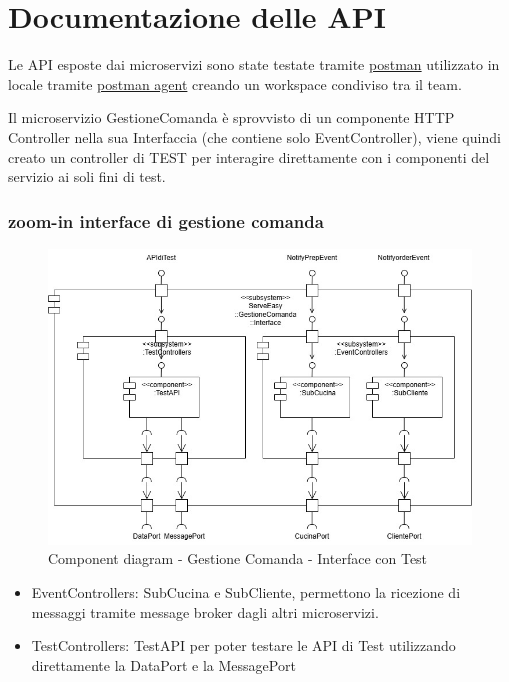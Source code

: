 \section{Documentazione delle API}

Le API esposte dai microservizi sono state testate tramite \href{https://www.postman.com/}{postman} utilizzato in locale tramite \href{https://www.postman.com/downloads/postman-agent/}{postman agent} creando un workspace condiviso tra il team.

Il microservizio GestioneComanda è sprovvisto di un componente HTTP Controller nella sua Interfaccia (che contiene solo EventController), viene quindi creato un controller di TEST per interagire direttamente con i componenti del servizio ai soli fini di test.

\subsubsection{zoom-in interface di gestione comanda}
\begin{figure}[H]
	\centering
	\includegraphics[scale=0.5]{iterazione1/images/component_comanda_w_test-GestioneComanda__Interface.jpg}
	\caption{Component diagram - Gestione Comanda - Interface con Test
    \label{fig:component_comanda_w_test-GestioneComanda__Interface}}
\end{figure}
\begin{itemize}
    \item EventControllers: SubCucina e SubCliente, permettono la ricezione di messaggi tramite message broker dagli altri microservizi.
    \item TestControllers: TestAPI per poter testare le API di Test utilizzando direttamente la DataPort e la MessagePort
\end{itemize}


